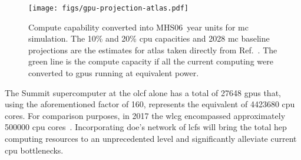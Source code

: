 \begin{figure}
  \centering%
  \texttt{[image: figs/gpu-projection-atlas.pdf]}%
  \caption{Compute capability converted into \si{MHS06.year} units for \acs{mc}
  simulation. The 10\% and 20\% \ac{cpu} capacities and 2028 \acs{mc} baseline
  projections are the estimates for \acs{atlas} taken directly from
  Ref.~\cite{the_atlas_collaboration_atlas_2020}.  The green line is the compute
  capacity if all the current computing were converted to \acp{gpu} running at
  equivalent power.}%
  \label{fig:gpu-projection}
\end{figure}

The Summit supercomputer at the \ac{olcf} alone has a total of \num{27648}
\acp{gpu} that, using the aforementioned factor of 160, represents the
equivalent of \num{4423680} \ac{cpu} cores. For comparison purposes, in 2017 the
\ac{wlcg} encompassed approximately \num{500000} \ac{cpu}
cores~\cite{valassi_using_2020}. Incorporating \ac{doe}'s network of \acp{lcf}
will bring the total \ac{hep} computing resources to an unprecedented level and
significantly alleviate current \ac{cpu} bottlenecks.
